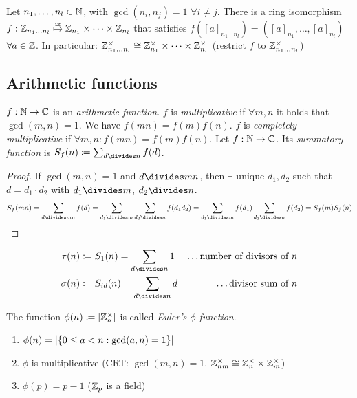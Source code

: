 \documentclass[NumTh.tex]{subfiles}
\begin{document}
\begin{ex}
  Let $n_1,\dots,n_l \in \mathbb{N}$, with $\gcd(n_i,n_j)= 1$ $\forall i \neq j$.
  There is a ring isomorphism $f: \mathbb{Z}_{n_1 \dots n_l} \overset{\simeq}{\mapsto} \mathbb{Z}_{n_1} \times \dots \times \mathbb{Z}_{n_l}$ that satisfies
  $f([a]_{n_1 \dots n_l}) = ([a]_{n_1},\dots,[a]_{n_l})$ $\forall a \in \mathbb{Z}$.
  In particular: $\mathbb{Z}_{n_1 \dots n_l}^\times \cong \mathbb{Z}_{n_1}^\times \times \dots \times \mathbb{Z}_{n_l}^\times$ (restrict $f$ to $\mathbb{Z}_{n_1 \dots n_l}^\times$)
\end{ex}


\subsection{Arithmetic functions}

\begin{defi}
  $f: \mathbb{N} \to \mathbb{C}$ is an \emph{arithmetic function}.
  $f$ is \emph{multiplicative} if $\forall m,n $ it holds that $\gcd(m,n) = 1$. We have $f(mn) = f(m) f(n)$.
  $f$ is \emph{completely multiplicative} if $\forall m,n: f(mn) = f(m) f(n)$.
  Let $f: \mathbb{N} \to \mathbb{C}$. Its \emph{summatory function} is $S_{f}(n) \coloneq \sum_{d\divides n} f(d)$.
\end{defi}
\begin{proof}
  If $\gcd(m,n) = 1$ and $d\divides mn$, then $\exists$ unique $d_1,d_2$ such that $d = d_1 \cdot d_2$ with $d_1 \divides  m$, $d_2\divides n$.
  \[S_f (mn) = \sum_{d\divides mn} f(d) = \sum_{d_1\divides m} \sum_{d_2\divides n} f(d_1 d_2) = \sum_{d_1\divides m} f(d_1) \sum_{d_2\divides n} f(d_2) = S_f(m) S_f(n)\]
\end{proof}

\begin{ex}
  \begin{align*}
    \tau(n) &\coloneq S_1(n) = \sum_{d\divides n} 1 &\text{\dots number of divisors of $n$} \\
    \sigma(n) &\coloneq S_{id}(n) = \sum_{d\divides n} d &\text{\dots divisor sum of $n$}
  \end{align*}
\end{ex}

\begin{defi}
  The function $\phi(n) \coloneq \left\vert{\mathbb{Z}_n^\times}\right\vert$ is called \emph{Euler's $\phi$-function}.
\end{defi}

\begin{rem}
  \begin{enumerate}
    \item $\phi(n) = \left\vert{\left\{ 0 \leq a < n : \gcd(a,n) = 1\right\}}\right\vert$
    \item $\phi$ is multiplicative (CRT: $\gcd(m,n) = 1$. $\mathbb{Z}_{nm}^\times \cong \mathbb{Z}_n^\times \times \mathbb{Z}_m^\times$)
    \item $\phi(p) = p - 1$ ($\mathbb{Z}_p$ is a field)
  \end{enumerate}
\end{rem}
\end{document}
